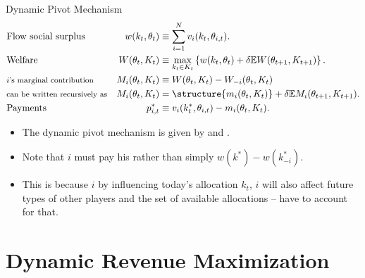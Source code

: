 \documentclass[english,10pt
,aspectratio=169
]{beamer}
\begin{document}
\begin{frame}{Dynamic Pivot Mechanism}
\vspace{-2em}\begin{align*}
	&\text{Flow social surplus}	& w(k_t,\theta_t)	&\equiv \sum_{i=1}^N v_i(k_t,\theta_{i,t}).
	\\
	&\text{Welfare}	& W(\theta_t,K_t)	&\equiv \max_{k_t \in K_t} \left\{ w(k_t,\theta_t) + \delta \mathbb{E} W(\theta_{t+1},K_{t+1}) \right\}.
	\\
	&\text{\footnotesize $i$'s marginal contribution}	& M_i(\theta_t,K_t)	&\equiv W(\theta_t,K_t) - W_{-i}(\theta_t,K_t)
	\\
	&\text{\footnotesize can be written recursively as}	& M_i(\theta_t,K_t)	&= \structure{m_i(\theta_t,K_t)} + \delta \mathbb{E} M_i(\theta_{t+1},K_{t+1}).
	\\
	&\text{Payments}	& p_{i,t}^*	&\equiv v_i(k^*_t,\theta_{i,t}) - m_i(\theta_t,K_t).
\end{align*}\vspace{-1em}

\begin{itemize}
	\item The dynamic pivot mechanism is given by \structure{$\kappa = \kappa^*$} and .
	\item Note that $i$ must pay his  rather than simply $w(k^*)-w(k^*_{-i})$.
	\item This is because $i$ by influencing today's allocation $k_t$, $i$ will also affect future types of other players and the set of available allocations -- have to account for that.
\end{itemize}
\end{frame}



\section{Dynamic Revenue Maximization}
\end{document}
